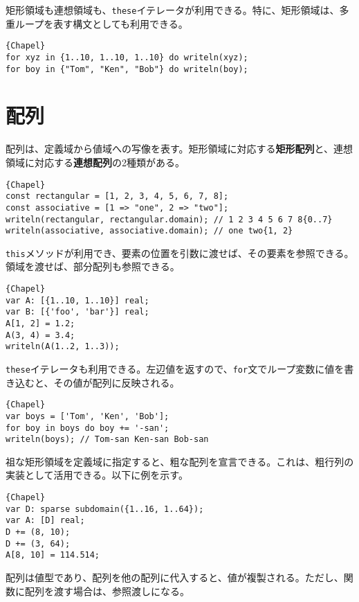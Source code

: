 \documentclass[10pt,a4paper]{book}
\begin{document}
矩形領域も連想領域も、\texttt{these}イテレータが利用できる。特に、矩形領域は、多重ループを表す構文としても利用できる。

\begin{Verbatim}{Chapel}
for xyz in {1..10, 1..10, 1..10} do writeln(xyz);
for boy in {"Tom", "Ken", "Bob"} do writeln(boy);
\end{Verbatim}

\section{配列}

配列は、定義域から値域への写像を表す。矩形領域に対応する\textbf{矩形配列}と、連想領域に対応する\textbf{連想配列}の2種類がある。

\begin{Verbatim}{Chapel}
const rectangular = [1, 2, 3, 4, 5, 6, 7, 8];
const associative = [1 => "one", 2 => "two"];
writeln(rectangular, rectangular.domain); // 1 2 3 4 5 6 7 8{0..7}
writeln(associative, associative.domain); // one two{1, 2}
\end{Verbatim}

\texttt{this}メソッドが利用でき、要素の位置を引数に渡せば、その要素を参照できる。領域を渡せば、部分配列も参照できる。

\begin{Verbatim}{Chapel}
var A: [{1..10, 1..10}] real;
var B: [{'foo', 'bar'}] real;
A[1, 2] = 1.2;
A(3, 4) = 3.4;
writeln(A(1..2, 1..3));
\end{Verbatim}

\texttt{these}イテレータも利用できる。左辺値を返すので、\texttt{for}文でループ変数に値を書き込むと、その値が配列に反映される。

\begin{Verbatim}{Chapel}
var boys = ['Tom', 'Ken', 'Bob'];
for boy in boys do boy += '-san';
writeln(boys); // Tom-san Ken-san Bob-san
\end{Verbatim}

祖な矩形領域を定義域に指定すると、粗な配列を宣言できる。これは、粗行列の実装として活用できる。以下に例を示す。

\begin{Verbatim}{Chapel}
var D: sparse subdomain({1..16, 1..64});
var A: [D] real;
D += (8, 10);
D += (3, 64);
A[8, 10] = 114.514;
\end{Verbatim}

配列は値型であり、配列を他の配列に代入すると、値が複製される。ただし、関数に配列を渡す場合は、参照渡しになる。
\end{document}
